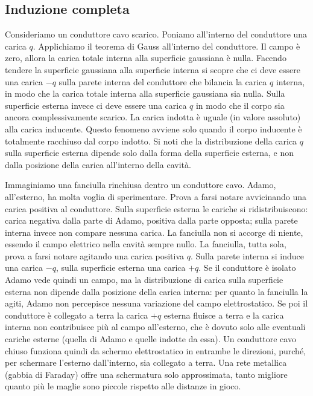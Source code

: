\subsection{Induzione completa}
Consideriamo un conduttore cavo scarico. Poniamo all'interno del conduttore una carica $q$. Applichiamo il teorema di Gauss all'interno del conduttore. Il campo è zero, allora la carica totale interna alla superficie gaussiana è nulla. Facendo tendere la superficie gaussiana alla superficie interna si scopre che ci deve essere una carica $-q$ sulla parete interna del conduttore che bilancia la carica $q$ interna, in modo che la carica totale interna alla superficie gaussiana sia nulla. Sulla superficie esterna invece ci deve essere una carica $q$ in modo che il corpo sia ancora complessivamente scarico. La carica indotta è uguale (in valore assoluto) alla carica inducente. Questo fenomeno avviene solo quando il corpo inducente è totalmente racchiuso dal corpo indotto. Si noti che la distribuzione della carica $q$ sulla superficie esterna dipende solo dalla forma della superficie esterna, e non dalla posizione della carica all'interno della cavità.
\begin{Es}
  Im\-ma\-gi\-nia\-mo una fanciulla rinchiusa dentro un conduttore cavo. Adamo, all'esterno, ha molta voglia di sperimentare. Prova a farsi notare avvicinando una carica positiva al conduttore. Sulla superficie esterna le cariche si ridistribuiscono: carica negativa dalla parte di Adamo, positiva dalla parte opposta; sulla parete interna invece non compare nessuna carica. La fanciulla non si accorge di niente, essendo il campo elettrico nella cavità sempre nullo. La fanciulla, tutta sola, prova a farsi notare agitando una carica positiva $q$. Sulla parete interna si induce una carica $-q$, sulla superficie esterna una carica $+q$. Se il conduttore è isolato Adamo vede quindi un campo, ma la distribuzione di carica sulla superficie esterna non dipende dalla posizione della carica interna: per quanto la fanciulla la agiti, Adamo non percepisce nessuna variazione del campo elettrostatico. Se poi il conduttore è collegato a terra la carica $+q$ esterna fluisce a terra e la carica interna non contribuisce più al campo all'esterno, che è dovuto solo alle eventuali cariche esterne (quella di Adamo e quelle indotte da essa). Un conduttore cavo chiuso funziona quindi da schermo elettrostatico in entrambe le direzioni, purché, per schermare l'esterno dall'interno, sia collegato a terra. Una rete metallica (gabbia di Faraday) offre una schermatura solo approssimata, tanto migliore quanto più le maglie sono piccole rispetto alle distanze in gioco.
\end{Es}
